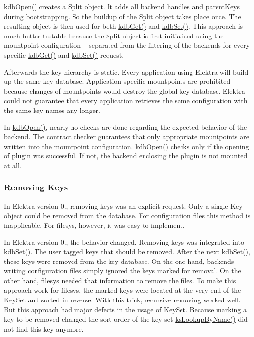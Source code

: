 {\ttfamily \hyperlink{group__kdb_ga6808defe5870f328dd17910aacbdc6ca}{kdb\+Open()}} creates a {\ttfamily Split} object. It adds all backend handles and {\ttfamily parent\+Keys} during bootstrapping. So the buildup of the {\ttfamily Split} object takes place once. The resulting object is then used for both {\ttfamily \hyperlink{group__kdb_ga28e385fd9cb7ccfe0b2f1ed2f62453a1}{kdb\+Get()}} and {\ttfamily \hyperlink{group__kdb_ga11436b058408f83d303ca5e996832bcf}{kdb\+Set()}}. This approach is much better testable because the {\ttfamily Split} object is first initialised using the mountpoint configuration -- separated from the filtering of the backends for every specific {\ttfamily \hyperlink{group__kdb_ga28e385fd9cb7ccfe0b2f1ed2f62453a1}{kdb\+Get()}} and {\ttfamily \hyperlink{group__kdb_ga11436b058408f83d303ca5e996832bcf}{kdb\+Set()}} request.

Afterwards the key hierarchy is static. Every application using Elektra will build up the same key database. Application-\/specific mountpoints are prohibited because changes of mountpoints would destroy the global key database. Elektra could not guarantee that every application retrieves the same configuration with the same key names any longer.

In {\ttfamily \hyperlink{group__kdb_ga6808defe5870f328dd17910aacbdc6ca}{kdb\+Open()}}, nearly no checks are done regarding the expected behavior of the backend. The contract checker guarantees that only appropriate mountpoints are written into the mountpoint configuration. {\ttfamily \hyperlink{group__kdb_ga6808defe5870f328dd17910aacbdc6ca}{kdb\+Open()}} checks only if the opening of plugin was successful. If not, the backend enclosing the plugin is not mounted at all.

\subsubsection*{Removing Keys}

In Elektra version 0., removing keys was an explicit request. Only a single {\ttfamily Key} object could be removed from the database. For configuration files this method is inapplicable. For {\ttfamily filesys}, however, it was easy to implement.

In Elektra version 0., the behavior changed. Removing keys was integrated into {\ttfamily \hyperlink{group__kdb_ga11436b058408f83d303ca5e996832bcf}{kdb\+Set()}}. The user tagged keys that should be removed. After the next {\ttfamily \hyperlink{group__kdb_ga11436b058408f83d303ca5e996832bcf}{kdb\+Set()}}, these keys were removed from the key database. On the one hand, backends writing configuration files simply ignored the keys marked for removal. On the other hand, {\ttfamily filesys} needed that information to remove the files. To make this approach work for {\ttfamily filesys}, the marked keys were located at the very end of the {\ttfamily Key\+Set} and sorted in reverse. With this trick, recursive removing worked well. But this approach had major defects in the usage of {\ttfamily Key\+Set}. Because marking a key to be removed changed the sort order of the key set {\ttfamily \hyperlink{group__keyset_gad2e30fb6d4739d917c5abb2ac2f9c1a1}{ks\+Lookup\+By\+Name()}} did not find this key anymore.

